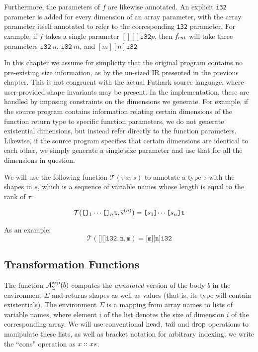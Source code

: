 Furthermore, the parameters of \(f\) are likewise annotated.  An
explicit \texttt{i32} parameter is added for every dimension of an
array parameter, with the array parameter itself annotated to refer to
the corresponding \texttt{i32} parameter.  For example, if \(f\) takes
a single parameter \([][]\texttt{i32} p\), then \(f_{\textrm{ext}}\) will take
three parameters \(\texttt{i32}~n\), \(\texttt{i32}~m\), and
\([m][n]\texttt{i32}\)

In this chapter we assume for simplicity that the original program
contains no pre-existing size information, as by the un-sized IR
presented in the previous chapter.  This is not congruent with the
actual Futhark source language, where user-provided shape invariants
may be present.  In the implementation, these are handled by imposing
constraints on the dimensions we generate.  For example, if the source
program contains information relating certain dimensions of the
function return type to specific function parameters, we do not
generate existential dimensions, but instead refer directly to the
function parameters.  Likewise, if the source program specifies that
certain dimensions are identical to each other, we simply generate a
single size parameter and use that for all the dimensions in question.

We will use the following function \(\mathcal{T}(\tau~x,s)\) to
annotate a type \(\tau\) with the shapes in \(s\), which is a sequence
of variable names whose length is equal to the rank of \(\tau\):

\begin{align*}
  \mathcal{T}(\texttt{[]}_{1}\cdots\texttt{[]}_n\texttt{t},\overline{s}^{(n)}) = \texttt{[$s_{1}$]$\cdots$[$s_{n}$]\texttt{t}}
\end{align*}%

As an example:
\[
\mathcal{T}(\texttt{[][]i32}, \texttt{n}, \texttt{m}) = \texttt{[m][n]i32}
\]

\subsection{Transformation Functions}
\label{sec:TransformationFunctions}

The function \(\mathcal{A}_{\Sigma}^{\text{exp}}(b)\) computes the
\textit{annotated} version of the body \(b\) in the environment
\(\Sigma\) and returns shapes as well as values (that is, its type
will contain existentials).  The environment \(\Sigma\) is a mapping
from array names to lists of variable names, where element \(i\) of
the list denotes the size of dimension \(i\) of the corresponding
array.  We will use conventional \(\textrm{head}\), \(\textrm{tail}\) and \(\textrm{drop}\)
operations to manipulate these lists, as well as bracket notation for
arbitrary indexing; we write the ``cons'' operation as
\(x :: xs\).

